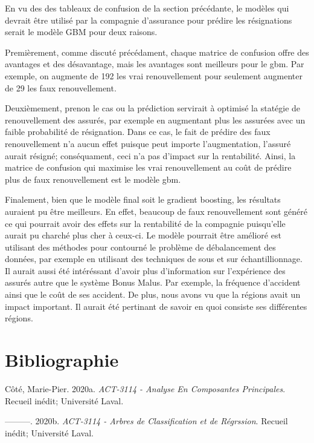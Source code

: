 \documentclass[]{article}
\begin{document}
En vu des des tableaux de confusion de la section précédante, le modèles
qui devrait être utilisé par la compagnie d'assurance pour prédire les
résignations serait le modèle GBM pour deux raisons.

Premièrement, comme discuté précédament, chaque matrice de confusion
offre des avantages et des désavantage, mais les avantages sont
meilleurs pour le gbm. Par exemple, on augmente de 192 les vrai
renouvellement pour seulement augmenter de 29 les faux renouvellement.

Deuxièmement, prenon le cas ou la prédiction servirait à optimisé la
statégie de renouvellement des assurés, par exemple en augmentant plus
les assurées avec un faible probabilité de résignation. Dans ce cas, le
fait de prédire des faux renouvellement n'a aucun effet puisque peut
importe l'augmentation, l'assuré aurait résigné; conséquament, ceci n'a
pas d'impact sur la rentabilité. Ainsi, la matrice de confusion qui
maximise les vrai renouvellement au coût de prédire plus de faux
renouvellement est le modèle gbm.

Finalement, bien que le modèle final soit le gradient boosting, les
résultats auraient pu être meilleurs. En effet, beaucoup de faux
renouvellement sont généré ce qui pourrait avoir des effets sur la
rentabilité de la compagnie puisqu'elle aurait pu charché plus cher à
ceux-ci. Le modèle pourrait être amélioré est utilisant des méthodes
pour contourné le problème de débalancement des données, par exemple en
utilisant des techniques de sous et sur échantillionnage. Il aurait
aussi été intéréssant d'avoir plus d'information sur l'expérience des
assurés autre que le système Bonus Malus. Par exemple, la fréquence
d'accident ainsi que le coût de ses accident. De plus, nous avons vu que
la régions avait un impact important. Il aurait été pertinant de savoir
en quoi consiste ses différentes régions.

\newpage

\section*{Bibliographie}\label{bibliographie}

\hypertarget{refs}{}
\hypertarget{ref-AnalyseComposantesPrincipales}{}
Côté, Marie-Pier. 2020a. \emph{ACT-3114 - Analyse En Composantes
Principales}. Recueil inédit; Université Laval.

\hypertarget{ref-Arbre}{}
---------. 2020b. \emph{ACT-3114 - Arbres de Classification et de
Régrssion}. Recueil inédit; Université Laval.
\end{document}
